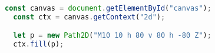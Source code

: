 \begin{lstlisting}[language=TypeScript, style=mystyle]
  const canvas = document.getElementById("canvas");
  const ctx = canvas.getContext("2d");

  let p = new Path2D("M10 10 h 80 v 80 h -80 Z");
  ctx.fill(p);
\end{lstlisting}

\begin{center}
\end{center}
